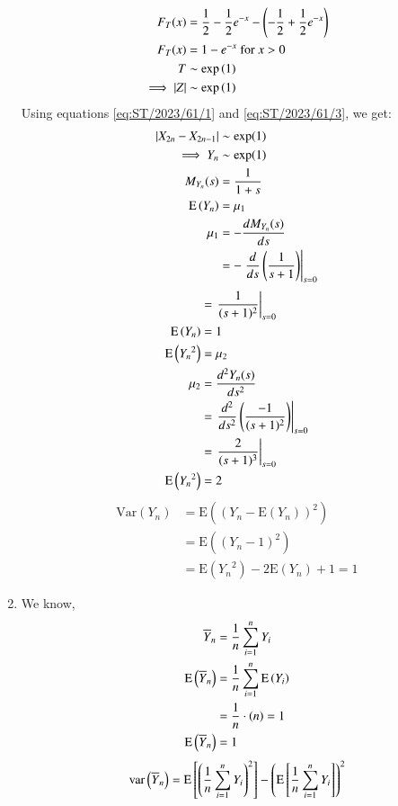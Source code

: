 \documentclass[journal,12pt,twocolumn]{IEEEtran}
\begin{document}
\begin{enumerate}
\begin{align}
F_T(x) &= \frac{1}{2} - \frac{1}{2} e^{-x} - \brak{- \frac{1}{2} + \frac{1}{2} e^{-x}} \\
F_T(x) &= 1 - e^{-x} \text{ for $x>0$} \\
T &\sim \exp\brak{1} \\
\implies |Z| &\sim \exp\brak{1}  \label{eq:ST/2023/61/3}
\end{align}
Using equations \eqref{eq:ST/2023/61/1} and \eqref{eq:ST/2023/61/3}, we get:
\begin{align}
|X_{2n} - X_{2n-1}| &\sim \exp(1) \\
\implies Y_n &\sim \exp(1)  \\
M_{Y_n}(s) &= \frac{1}{1+s} \\
\text{E}\left(Y_n\right) &= \mu_1 \\
\mu_1 &= -\frac{dM_{Y_n}(s)}{ds} \\
&= -\left. \frac{d}{ds} \left(\frac{1}{s + 1}\right) \right|_{s=0} 
\end{align}
\begin{align}
&= \left. \frac{1}{(s + 1)^2} \right|_{s=0} \\ 
\text{E}\left(Y_n\right) &= 1 \\
\text{E}\left({Y_n}^2\right) &= \mu_2 \\
\mu_2 &= \frac{d^2{Y_n}(s)}{ds^2} \\
&= \left. \frac{d^2}{ds^2} \left(\frac{-1}{(s + 1)^2}\right) \right|_{s=0} \\
&= \left. \frac{2}{(s + 1)^3} \right|_{s=0} \\
\text{E}\left({Y_n}^2\right) &= 2 
\end{align}
\begin{align}
\mathrm{Var}(Y_n) &= \mathrm{E}((Y_n -\mathrm{E}(Y_n))^2) \\
&= \mathrm{E}((Y_n - 1)^2) \\
&= \mathrm{E}({Y_n}^2) -2 \mathrm{E}(Y_n) + 1 = 1  
\end{align}
\item We know, \begin{align}
\overline{Y}_n &= \frac{1}{n} \sum_{i=1}^{n} Y_i \\
\mathrm{E}\left(\overline{Y}_n\right) &= \frac{1}{n} \sum_{i=1}^{n} \mathrm{E}\left(Y_i\right) \\
&= \frac{1}{n} \cdot \left(n\right) = 1 \\
\mathrm{E}\left(\overline{Y}_n\right)&= 1 
\end{align}
\begin{align}
    \text{var}\brak{\overline{Y}_n} &= \text{E}\sbrak{\brak{\frac{1}{n} \sum_{i=1}^{n} Y_i}^2} - \brak{\text{E}\sbrak{\frac{1}{n} \sum_{i=1}^{n} Y_i}}^2\\

\end{align}
\end{enumerate}
\end{document}
